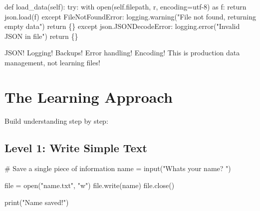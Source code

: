 \documentclass[
  letterpaper,
  DIV=11,
  numbers=noendperiod,
  oneside]{scrreprt}
\newenvironment{Shaded}{}{}
\newcommand{\BuiltInTok}[1]{\textcolor[rgb]{0.84,0.23,0.29}{#1}}
\newcommand{\CommentTok}[1]{\textcolor[rgb]{0.42,0.45,0.49}{#1}}
\newcommand{\ControlFlowTok}[1]{\textcolor[rgb]{0.84,0.23,0.29}{#1}}
\newcommand{\ImportTok}[1]{\textcolor[rgb]{0.01,0.18,0.38}{#1}}
\newcommand{\KeywordTok}[1]{\textcolor[rgb]{0.84,0.23,0.29}{#1}}
\newcommand{\NormalTok}[1]{\textcolor[rgb]{0.14,0.16,0.18}{#1}}
\newcommand{\OperatorTok}[1]{\textcolor[rgb]{0.14,0.16,0.18}{#1}}
\newcommand{\PreprocessorTok}[1]{\textcolor[rgb]{0.84,0.23,0.29}{#1}}
\newcommand{\StringTok}[1]{\textcolor[rgb]{0.01,0.18,0.38}{#1}}
\newcommand{\VariableTok}[1]{\textcolor[rgb]{0.89,0.38,0.04}{#1}}
\begin{document}
\begin{Shaded}
\begin{Highlighting}[]
    \KeywordTok{def}\NormalTok{ load\_data(}\VariableTok{self}\NormalTok{):}
        \ControlFlowTok{try}\NormalTok{:}
            \ControlFlowTok{with} \BuiltInTok{open}\NormalTok{(}\VariableTok{self}\NormalTok{.filepath, }\StringTok{\textquotesingle{}r\textquotesingle{}}\NormalTok{, encoding}\OperatorTok{=}\StringTok{\textquotesingle{}utf{-}8\textquotesingle{}}\NormalTok{) }\ImportTok{as}\NormalTok{ f:}
                \ControlFlowTok{return}\NormalTok{ json.load(f)}
        \ControlFlowTok{except} \PreprocessorTok{FileNotFoundError}\NormalTok{:}
\NormalTok{            logging.warning(}\StringTok{"File not found, returning empty data"}\NormalTok{)}
            \ControlFlowTok{return}\NormalTok{ \{\}}
        \ControlFlowTok{except}\NormalTok{ json.JSONDecodeError:}
\NormalTok{            logging.error(}\StringTok{"Invalid JSON in file"}\NormalTok{)}
            \ControlFlowTok{return}\NormalTok{ \{\}}
\end{Highlighting}
\end{Shaded}

JSON! Logging! Backups! Error handling! Encoding! This is production
data management, not learning files!

\section{The Learning Approach}\label{the-learning-approach-7}

Build understanding step by step:

\subsection{Level 1: Write Simple Text}\label{level-1-write-simple-text}

\begin{Shaded}
\begin{Highlighting}[]
\CommentTok{\# Save a single piece of information}
\NormalTok{name }\OperatorTok{=} \BuiltInTok{input}\NormalTok{(}\StringTok{"What\textquotesingle{}s your name? "}\NormalTok{)}

\BuiltInTok{file} \OperatorTok{=} \BuiltInTok{open}\NormalTok{(}\StringTok{"name.txt"}\NormalTok{, }\StringTok{"w"}\NormalTok{)}
\BuiltInTok{file}\NormalTok{.write(name)}
\BuiltInTok{file}\NormalTok{.close()}

\BuiltInTok{print}\NormalTok{(}\StringTok{"Name saved!"}\NormalTok{)}
\end{Highlighting}
\end{Shaded}
\end{document}
